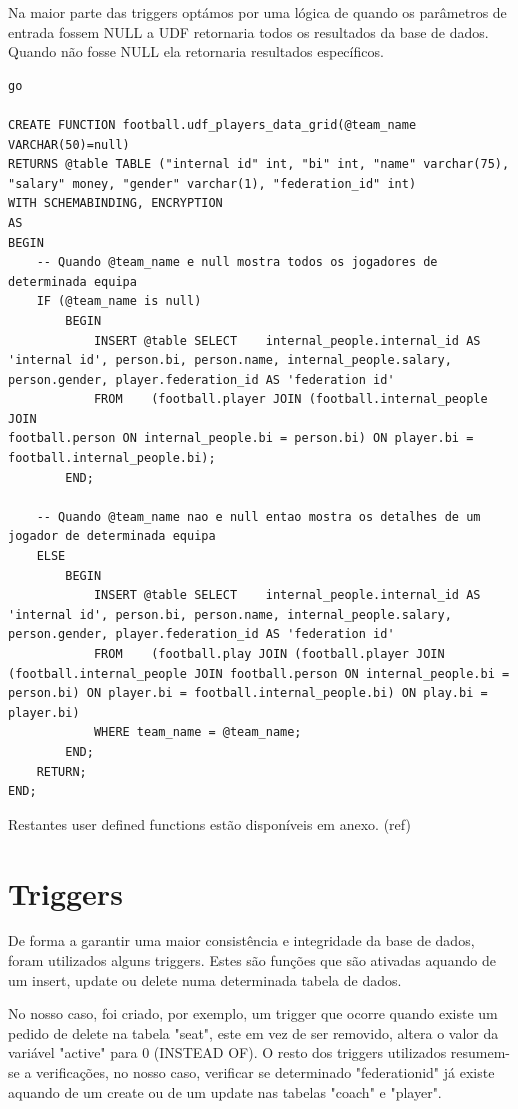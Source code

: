 \documentclass[pdftex,12pt,a4paper]{report}
\begin{document}
Na maior parte das triggers optámos por uma lógica de quando os parâmetros de entrada fossem NULL a UDF retornaria todos os resultados da base de dados. Quando não fosse NULL ela retornaria resultados específicos.


\begin{lstlisting}
go

CREATE FUNCTION football.udf_players_data_grid(@team_name VARCHAR(50)=null)
RETURNS @table TABLE ("internal id" int, "bi" int, "name" varchar(75), "salary" money, "gender" varchar(1), "federation_id" int)
WITH SCHEMABINDING, ENCRYPTION
AS
BEGIN
	-- Quando @team_name e null mostra todos os jogadores de determinada equipa
	IF (@team_name is null)
		BEGIN
			INSERT @table SELECT	internal_people.internal_id AS 'internal id', person.bi, person.name, internal_people.salary, person.gender, player.federation_id AS 'federation id'
			FROM	(football.player JOIN (football.internal_people JOIN
football.person ON internal_people.bi = person.bi) ON player.bi = football.internal_people.bi);
		END;
		
	-- Quando @team_name nao e null entao mostra os detalhes de um jogador de determinada equipa
	ELSE
		BEGIN
			INSERT @table SELECT	internal_people.internal_id AS 'internal id', person.bi, person.name, internal_people.salary, person.gender, player.federation_id AS 'federation id'
			FROM	(football.play JOIN	(football.player JOIN (football.internal_people JOIN football.person ON internal_people.bi = person.bi) ON player.bi = football.internal_people.bi) ON play.bi = player.bi)
			WHERE team_name = @team_name;
		END;
	RETURN;
END;
\end{lstlisting}
 \vspace{0,5in}

Restantes user defined functions estão disponíveis em anexo. (ref)

\newpage
\section{Triggers}
De forma a garantir uma maior consistência e integridade da base de dados, foram utilizados alguns triggers. Estes são funções que são ativadas aquando de um insert, update ou delete numa determinada tabela de dados.

No nosso caso, foi criado, por exemplo, um  trigger que ocorre quando existe um pedido de delete na tabela "seat", este em vez de ser removido, altera o valor da variável "active" para 0 (INSTEAD OF).
O resto dos triggers utilizados resumem-se a verificações, no nosso caso, verificar se determinado "federation{\textunderscore}id" já existe aquando de um create ou de um update nas tabelas "coach" e "player".
\end{document}
